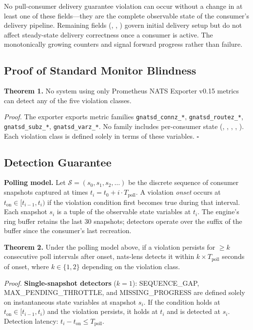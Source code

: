 \documentclass[sigconf,nonacm]{acmart}
\begin{document}
No pull-consumer delivery guarantee violation can occur without a change
in at least one of these fields---they are the complete observable state
of the consumer's delivery pipeline. Remaining fields (,
, ) govern initial delivery setup
but do not affect steady-state delivery correctness once a consumer is active.
The monotonically growing counters  and
 signal forward progress rather than failure.

\subsection{Proof of Standard Monitor Blindness}

\textbf{Theorem 1.}\label{thm:blindness} No system using only Prometheus NATS Exporter v0.15
metrics can detect any of the five violation classes.

\textit{Proof.} The exporter exports metric families
\texttt{gnatsd\_connz\_*}, \texttt{gnatsd\_routez\_*},
\texttt{gnatsd\_subz\_*}, \texttt{gnatsd\_varz\_*}. No family includes
per-consumer state (, ,
, ,
). Each violation class is defined solely in
terms of these variables. $\square$

\subsection{Detection Guarantee}

\textbf{Polling model.} Let $\mathcal{S} = (s_0, s_1, s_2, \ldots)$ be the
discrete sequence of consumer snapshots captured at times
$t_i = t_0 + i \cdot T_\mathrm{poll}$.
A violation \emph{onset} occurs at $t_\mathrm{on} \in [t_{i-1}, t_i)$
if the violation condition first becomes true during that interval.
Each snapshot $s_i$ is a tuple of the observable state variables at $t_i$.
The engine's ring buffer retains the last 30 snapshots; detectors operate
over the suffix of the buffer since the consumer's last recreation.

\textbf{Theorem 2.} Under the polling model above, if a violation persists
for $\geq k$ consecutive poll intervals after onset, nats-lens detects it
within $k \times T_\mathrm{poll}$ seconds of onset,
where $k \in \{1, 2\}$ depending on the violation class.

\textit{Proof.}
\textbf{Single-snapshot detectors} ($k=1$): SEQUENCE\_GAP,
MAX\_PENDING\_\allowbreak THROTTLE, and MISSING\_PROGRESS are defined
solely on instantaneous state variables at snapshot $s_i$.
If the condition holds at $t_\mathrm{on} \in [t_{i-1}, t_i)$
and the violation persists, it holds at $t_i$ and is detected at $s_i$.
Detection latency: $t_i - t_\mathrm{on} \leq T_\mathrm{poll}$.
\end{document}
